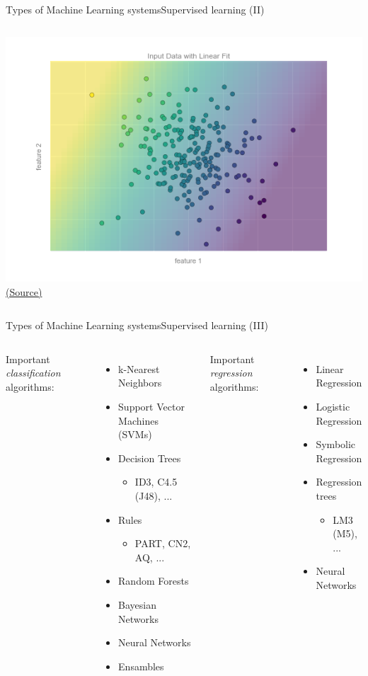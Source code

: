 \documentclass[10pt,compress]{beamer} %
\begin{document}
\begin{frame}{Types of Machine Learning systems}{Supervised learning (II)}
\begin{columns}
			\includegraphics[width=0.8\linewidth]{figs/05.01-regression-3.png}\\
    		\tiny{\href{https://jakevdp.github.io/PythonDataScienceHandbook/05.01-what-is-machine-learning.html}{(Source)}}
	\end{columns}
\end{frame}

\begin{frame}{Types of Machine Learning systems}{Supervised learning (III)}
	\begin{columns}
	   Important \textit{classification} algorithms:
	   \begin{itemize}
	   		\item k-Nearest Neighbors
			\item Support Vector Machines (SVMs)
			\item Decision Trees
				\begin{itemize}
				\item ID3, C4.5 (J48), ...
				\end{itemize}
			\item Rules
				\begin{itemize}
				\item PART, CN2, AQ, ...
				\end{itemize}
			\item Random Forests
			\item Bayesian Networks
			\item Neural Networks
			\item Ensambles
	   \end{itemize}
	   Important \textit{regression} algorithms:
	   \begin{itemize}
	   		\item Linear Regression
			\item Logistic Regression
			\item Symbolic Regression
			\item Regression trees
				\begin{itemize}
				\item LM3 (M5), ...
				\end{itemize}
			\item Neural Networks
	   \end{itemize}
	\end{columns} 
\end{frame}
\end{document}
